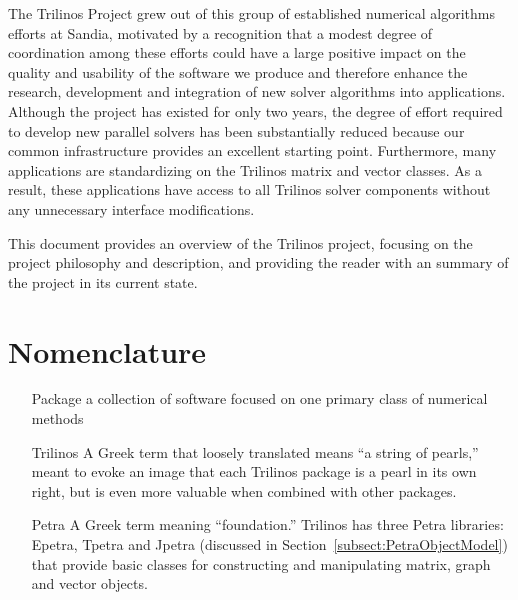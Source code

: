 \documentclass[12pt,relax]{SANDreport}
\begin{document}
The Trilinos Project grew out of this group of established numerical algorithms
efforts at Sandia, motivated by  a recognition that a modest degree of 
coordination among these efforts could have a large positive impact on the quality and
usability of the software we produce and therefore enhance the
research, development and integration of new solver algorithms into
applications.  Although the project has existed for only two years, the degree of effort
required to develop new parallel solvers has been substantially reduced because our common
infrastructure provides an excellent starting point.  Furthermore, many applications are
standardizing on the Trilinos matrix and vector classes.  As a result, these applications
have access to all Trilinos solver components without any unnecessary interface modifications.

This document provides an overview of the Trilinos project,
focusing on the project philosophy and description, and
providing the reader with an summary of the project in its current state.  


    \clearpage
    \section*{Nomenclature}
    \begin{itemize}
	\item[Package]
	    a collection of software focused on one primary class of numerical methods
	\item[Trilinos]
	    A Greek term that loosely translated means ``a string of pearls,'' meant
         to evoke an image that each Trilinos package is a pearl in its own right,
         but is even more valuable when combined with other packages.
	\item[Petra]
	    A Greek term meaning ``foundation.''  Trilinos has three Petra libraries: Epetra, 
	    Tpetra and Jpetra (discussed in Section~\ref{subsect:PetraObjectModel}) that
	    provide basic classes for constructing and manipulating matrix, graph and vector 
	    objects.
    \end{itemize}


    \SANDmain		%
\end{document}
